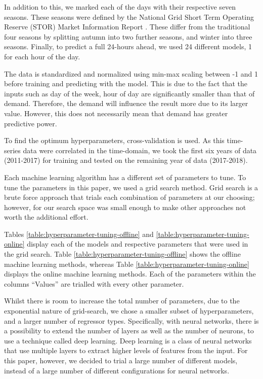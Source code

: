 \documentclass[final,3p,times,twocolumn,numbers]{elsarticle}
\begin{document}
In addition to this, we marked each of the days with their respective seven seasons. These seasons were defined by the National Grid Short Term Operating Reserve (STOR) Market Information Report \cite{ESO2019}. These differ from the traditional four seasons by splitting autumn into two further seasons, and winter into three seasons. Finally, to predict a full 24-hours ahead, we used 24 different models, 1 for each hour of the day. 


The data is standardized and normalized using min-max scaling between -1 and 1 before training and predicting with the model. This is due to the fact that the inputs such as day of the week, hour of day are significantly smaller than that of demand. Therefore, the demand will influence the result more due to its larger value. However, this does not necessarily mean that demand has greater predictive power.


To find the optimum hyperparameters, cross-validation is used. As this time-series data were correlated in the time-domain, we took the first six years of data (2011-2017) for training and tested on the remaining year of data (2017-2018).

Each machine learning algorithm has a different set of parameters to tune. To tune the parameters in this paper, we used a grid search method. Grid search is a brute force approach that trials each combination of parameters at our choosing; however, for our search space was small enough to make other approaches not worth the additional effort.

Tables \ref{table:hyperparameter-tuning-offline} and \ref{table:hyperparameter-tuning-online} display each of the models and respective parameters that were used in the grid search. Table \ref{table:hyperparameter-tuning-offline} shows the offline machine learning methods, whereas Table \ref{table:hyperparameter-tuning-online} displays the online machine learning methods. Each of the parameters within the columns ``Values'' are trialled with every other parameter.

Whilst there is room to increase the total number of parameters, due to the exponential nature of grid-search, we chose a smaller subset of hyperparameters, and a larger number of regressor types. Specifically, with neural networks, there is a possibility to extend the number of layers as well as the number of neurons, to use a technique called deep learning. Deep learning is a class of neural networks that use multiple layers to extract higher levels of features from the input. For this paper, however, we decided to trial a large number of different models, instead of a large number of different configurations for neural networks.
\end{document}
